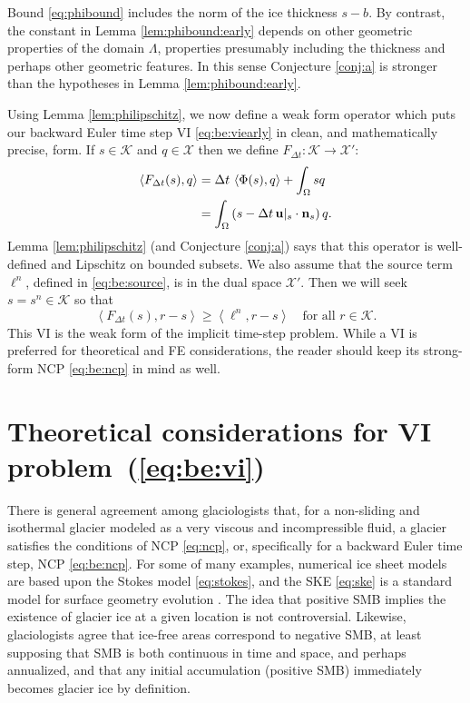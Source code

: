 \documentclass[hidelinks,onefignum,onetabnum,final]{siamart220329}  %
\newcommand{\bn}{\mathbf{n}}
\newcommand{\bu}{\mathbf{u}}
\newcommand{\cK}{\mathcal{K}}
\newcommand{\cX}{\mathcal{X}}
\newcommand{\ip}[2]{\left<#1,#2\right>}
\begin{document}
Bound \eqref{eq:phibound} includes the norm of the ice thickness $s-b$.  By contrast, the constant in Lemma \ref{lem:phibound:early} depends on other geometric properties of the domain $\Lambda$, properties presumably including the thickness and perhaps other geometric features.  In this sense Conjecture \ref{conj:a} is stronger than the hypotheses in Lemma \ref{lem:phibound:early}.

Using Lemma \ref{lem:philipschitz}, we now define a weak form operator which puts our backward Euler time step VI \eqref{eq:be:viearly} in clean, and mathematically precise, form.  If $s\in\cK$ and $q\in\cX$ then we define $F_{\Delta t}:\cK\to\cX'$:
\begin{align}
\ip{F_{\Delta t}(s)}{q} &= \Delta t\,\ip{\Phi(s)}{q} + \int_\Omega s q \label{eq:be:Fdefine}\\
    &= \int_\Omega \left(s - \Delta t\, \bu|_s \cdot \bn_s\right) q. \notag
\end{align}
Lemma \ref{lem:philipschitz} (and Conjecture \ref{conj:a}) says that this operator is well-defined and Lipschitz on bounded subsets.  We also assume that the source term $\ell^n$, defined in \eqref{eq:be:source}, is in the dual space $\cX'$.  Then we will seek $s = s^n \in \cK$ so that
\begin{equation}
\ip{F_{\Delta t}(s)}{r-s} \ge \ip{\ell^n}{r-s} \quad \text{for all } r \in \cK. \label{eq:be:vi}
\end{equation}
This VI is the weak form of the implicit time-step problem.  While a VI is preferred for theoretical and FE considerations, the reader should keep its strong-form NCP \eqref{eq:be:ncp} in mind as well.


\section{Theoretical considerations for VI problem~(\ref{eq:be:vi})} \label{sec:theory}

There is general agreement among glaciologists that, for a non-sliding and isothermal glacier modeled as a very viscous and incompressible fluid, a glacier satisfies the conditions of NCP \eqref{eq:ncp}, or, specifically for a backward Euler time step, NCP \eqref{eq:be:ncp}.  For some of many examples, numerical ice sheet models \cite{IsaacStadlerGhattas2015,WirbelJarosch2020} are based upon the Stokes model \eqref{eq:stokes}, and the SKE \eqref{eq:ske} is a standard model for surface geometry evolution \cite{GreveBlatter2009,SchoofHewitt2013}.  The idea that positive SMB implies the existence of glacier ice at a given location is not controversial.  Likewise, glaciologists agree that ice-free areas correspond to negative SMB, at least supposing that SMB is both continuous in time and space, and perhaps annualized, and that any initial accumulation (positive SMB) immediately becomes glacier ice by definition.
\end{document}
